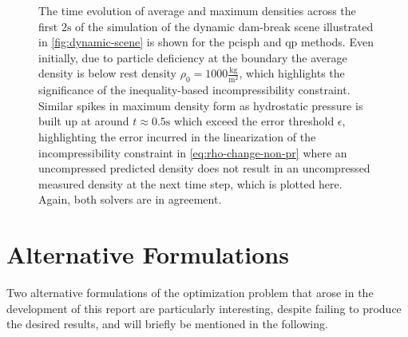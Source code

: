 \documentclass[conference]{IEEEtran}
\begin{document}
\begin{figure}
  \centering
  \caption{The time evolution of average and maximum densities across the first $2\text{s}$ of the simulation of the dynamic dam-break scene illustrated in \autoref{fig:dynamic-scene} is shown for the \ac{pcisph} and \ac{qp} methods. Even initially, due to particle deficiency at the boundary the average density is below rest density $\rho_0=1000\frac{\text{kg}}{\text{m}^2}$, which highlights the significance of the inequality-based incompressibility constraint. Similar spikes in maximum density form as hydrostatic pressure is built up at around $t\approx 0.5\text{s}$ which exceed the error threshold $\epsilon$, highlighting the error incurred in the linearization of the incompressibility constraint in \autoref{eq:rho-change-non-pr} where an uncompressed predicted density does not result in an uncompressed measured density at the next time step, which is plotted here. Again, both solvers are in agreement.} 
  \label{fig:density-graph}
\end{figure}


\section{Alternative Formulations}
Two alternative formulations of the optimization problem that arose in the development of this report are particularly interesting, despite failing to produce the desired results, and will briefly be mentioned in the following.
\end{document}
